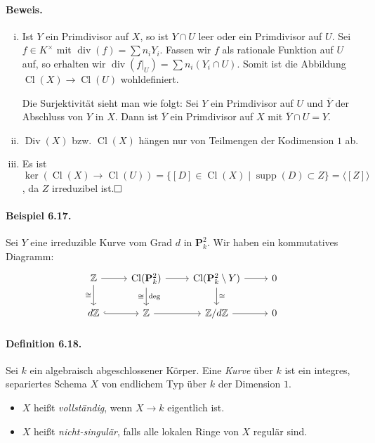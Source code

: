 \documentclass[11pt,b5paper,openany]{memoir}
\def \qed {$\hfill\square$}
\begin{document}
\paragraph{Beweis.}\begin{enumerate}[(i)]
\item Ist $Y$ ein Primdivisor auf $X$, so ist $Y\cap U$ leer oder ein Primdivisor auf $U$. Sei $f\in K^\times$ mit $\operatorname{div}(f)=\sum n_iY_i$. Fassen wir $f$ als rationale Funktion auf $U$ auf, so erhalten wir $\operatorname{div}(f|_U)=\sum n_i(Y_i\cap U)$. Somit ist die Abbildung $\operatorname{Cl}(X)\to\operatorname{Cl}(U)$ wohldefiniert.

Die Surjektivität sieht man wie folgt: Sei $Y$ ein Primdivisor auf $U$ und $\overline{Y}$ der Abschluss von $Y$ in $X$. Dann ist $\overline{Y}$ ein Primdivisor auf $X$ mit $\overline{Y}\cap U=Y$.
\item $\operatorname{Div}(X)$ bzw. $\operatorname{Cl}(X)$ hängen nur von Teilmengen der Kodimension $1$ ab.
\item Es ist $\ker(\operatorname{Cl}(X)\to\operatorname{Cl}(U)) = \{ [D]\in\operatorname{Cl}(X)\mid \operatorname{supp}(D)\subset Z\}=\langle[Z]\rangle$, da $Z$ irreduzibel ist.\qed
\end{enumerate}

\paragraph{Beispiel 6.17.}\label{6.17} Sei $Y$ eine irreduzible Kurve vom Grad $d$ in $\mathbf{P}_k^2$. Wir haben ein kommutatives Diagramm:
\[\begin{tikzcd}
\mathbb{Z} \rar\dar["\cong"'] & \operatorname{Cl}(\mathbf{P}_k^2) \rar\dar["\cong"', "\deg"]& \operatorname{Cl}(\mathbf{P}_k^2\setminus Y) \rar\dar["\cong"]& 0\\
d\mathbb{Z} \rar[hook] & \mathbb{Z}\rar & \mathbb{Z}/d\mathbb{Z}\rar & 0
\end{tikzcd}\]

\paragraph{Definition 6.18.}\label{6.18} Sei $k$ ein algebraisch abgeschlossener Körper. Eine \textit{Kurve} über $k$ ist ein integres, separiertes Schema $X$ von endlichem Typ über $k$ der Dimension $1$.
\begin{itemize}
\item $X$ heißt \textit{vollständig}, wenn $X\to k$ eigentlich ist.
\item $X$ heißt \textit{nicht-singulär}, falls alle lokalen Ringe von $X$ regulär sind.
\end{itemize}
\end{document}
